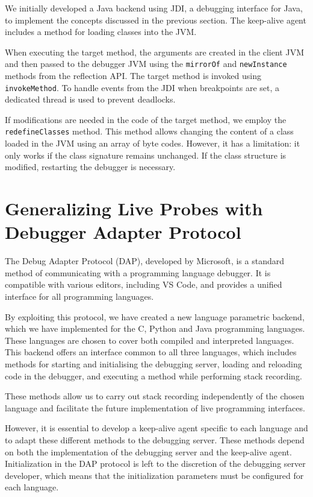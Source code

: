 \documentclass[english,submission]{programming}
\newcommand{\code}[1]{\colorbox{codegray}{\texttt{#1}}}
\begin{document}
We initially developed a Java backend using JDI, a debugging interface for Java, to implement the concepts discussed in the previous section. The keep-alive agent includes a method for loading classes into the JVM.

When executing the target method, the arguments are created in the client JVM and then passed to the debugger JVM using the \code{mirrorOf} and \code{newInstance} methods from the reflection API. The target method is invoked using \code{invokeMethod}. 
To handle events from the JDI when breakpoints are set, a dedicated thread is used to prevent deadlocks.

If modifications are needed in the code of the target method, we employ the \code{redefineClasses} method. 
This method allows changing the content of a class loaded in the JVM using an array of byte codes. 
However, it has a limitation: it only works if the class signature remains unchanged. 
If the class structure is modified, restarting the debugger is necessary.

\section{Generalizing Live Probes with Debugger Adapter Protocol}
\label{sec:generalizing-live-probes}
The Debug Adapter Protocol (DAP), developed by Microsoft, is a standard method of communicating with a programming language debugger. It is compatible with various editors, including VS Code, and provides a unified interface for all programming languages. 

By exploiting this protocol, we have created a new language parametric backend, which we have implemented for the C, Python and Java programming languages. These languages are chosen to cover both compiled and interpreted languages. This backend offers an interface common to all three languages, which includes methods for starting and initialising the debugging server, loading and reloading code in the debugger, and executing a method while performing stack recording. 

These methods allow us to carry out stack recording independently of the chosen language and facilitate the future implementation of live programming interfaces. 

However, it is essential to develop a keep-alive agent specific to each language and to adapt these different methods to the debugging server. These methods depend on both the implementation of the debugging server and the keep-alive agent. Initialization in the DAP protocol is left to the discretion of the debugging server developer, which means that the initialization parameters must be configured for each language.
\end{document}
